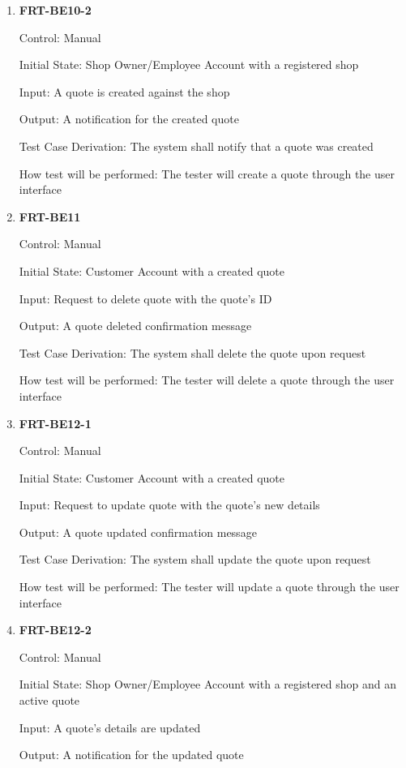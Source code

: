 \documentclass[12pt, titlepage]{article}
\begin{document}
\begin{enumerate}
	\item \textbf{FRT-BE10-2}

	      Control: Manual

	      Initial State: Shop Owner/Employee Account with a registered shop

	      Input: A quote is created against the shop

	      Output: A notification for the created quote

	      Test Case Derivation: The system shall notify that a quote was created

	      How test will be performed: The tester will create a quote through the user interface

	\item \textbf{FRT-BE11}

	      Control: Manual

	      Initial State: Customer Account with a created quote

	      Input: Request to delete quote with the quote's ID

	      Output: A quote deleted confirmation message

	      Test Case Derivation: The system shall delete the quote upon request

	      How test will be performed: The tester will delete a quote through the user interface

	\item \textbf{FRT-BE12-1}

	      Control: Manual

	      Initial State: Customer Account with a created quote

	      Input: Request to update quote with the quote's new details

	      Output: A quote updated confirmation message

	      Test Case Derivation: The system shall update the quote upon request

	      How test will be performed: The tester will update a quote through the user interface

	\item \textbf{FRT-BE12-2}

	      Control: Manual

	      Initial State: Shop Owner/Employee Account with a registered shop and an active quote

	      Input: A quote's details are updated

	      Output: A notification for the updated quote


\end{enumerate}
\end{document}
